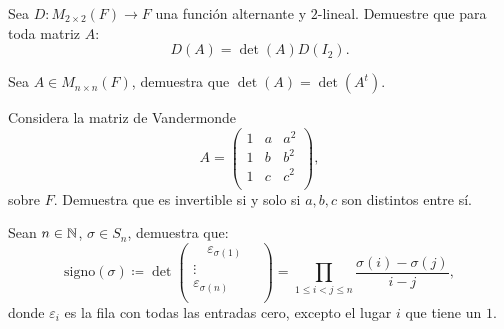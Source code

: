 \documentclass[12pt,a4paper]{book}
\begin{document}
    \begin{ejercicio}
        Sea $D : M_{2 \times 2}(F) \to F$ una función alternante y $2$-lineal. Demuestre que para toda matriz $A$:
        \begin{equation*}
        D(A) =  \det(A) D(I_{2}).
        \end{equation*}
    \end{ejercicio}

    \begin{ejercicio}
        Sea $A \in M_{n \times n}(F)$, demuestra que $\det(A) = \det(A^{t})$.
    \end{ejercicio}

    \begin{ejercicio}
        Considera la matriz de Vandermonde
        \begin{equation*}
        A = 
        \begin{pmatrix}
            1 & a & a^{2}\\
            1 & b & b^{2}\\
            1 & c & c^{2}\\
        \end{pmatrix},
        \end{equation*}
        sobre $F$. Demuestra que es invertible si y solo si $a, b, c$ son distintos entre sí.
    \end{ejercicio}

    \begin{ejercicio}
        Sean $n \in \mathbb{N}$, $\sigma \in S_{n}$, demuestra que:
        \begin{equation*}
        \text{signo}(\sigma) \coloneqq \det
        \begin{pmatrix}
            \quad \varepsilon_{\sigma (1)} \quad \\
            \vdots\\
            \varepsilon_{\sigma (n)}\\
        \end{pmatrix}
        = \prod_{1 \leq i < j \leq n} \frac{\sigma (i) - \sigma(j)}{i - j},
        \end{equation*}
        donde $\varepsilon_{i}$ es la fila con todas las entradas cero, excepto el lugar $i$ que tiene un $1$.
    \end{ejercicio}

    \clearpage
    \thispagestyle{empty}
    

\end{document}
